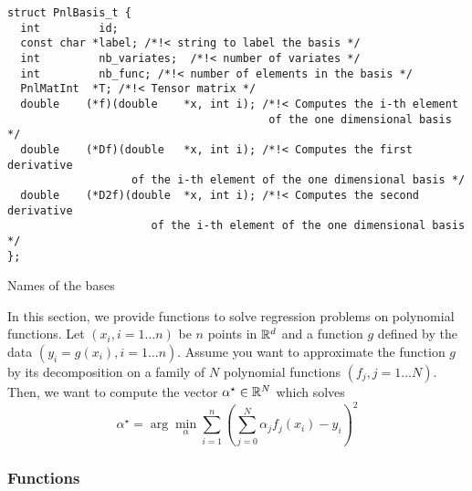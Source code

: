 \begin{verbatim}
struct PnlBasis_t {
  int         id;
  const char *label; /*!< string to label the basis */
  int         nb_variates;  /*!< number of variates */
  int         nb_func; /*!< number of elements in the basis */
  PnlMatInt  *T; /*!< Tensor matrix */
  double    (*f)(double    *x, int i); /*!< Computes the i-th element 
                                        of the one dimensional basis */
  double    (*Df)(double   *x, int i); /*!< Computes the first derivative 
                   of the i-th element of the one dimensional basis */
  double    (*D2f)(double  *x, int i); /*!< Computes the second derivative
                      of the i-th element of the one dimensional basis */
};
\end{verbatim}

\begin{table}[h!]
  \begin{describeconst}
  \end{describeconst}
  \caption{Names of the bases}
  \label{basis_index}
\end{table}

In this section, we provide functions to solve regression problems on
polynomial functions. Let $(x_i, i=1 \dots n)$ be $n$ points in ${\mathbb R}^d$ and a
function $g$ defined by the data $(y_i = g(x_i), i=1 \dots n)$. Assume you
want to approximate the function $g$ by its decomposition on a family of $N$
polynomial functions $(f_j, j=1\dots N)$. Then, we want to compute the vector
$\alpha^\star \in {\mathbb R}^N$ which solves
\begin{equation*} \alpha^\star = \arg\min_\alpha \sum_{i=1}^{n}
  \left(\sum_{j=0}^N \alpha_j f_j(x_i) - y_i\right)^2
\end{equation*}

\subsubsection{Functions}

